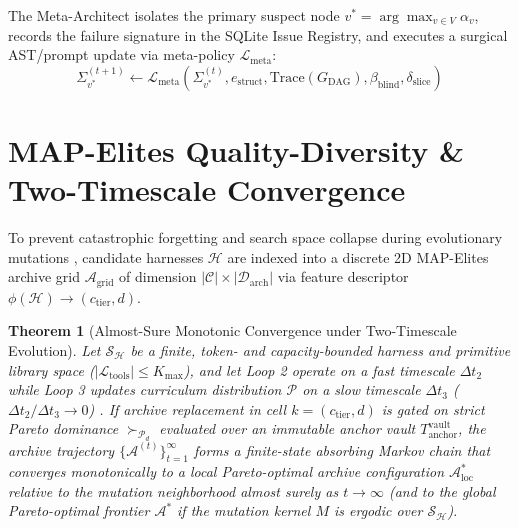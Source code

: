 \documentclass[10pt,twocolumn,letterpaper]{article}
\newtheorem{theorem}{Theorem}
\begin{document}
The Meta-Architect isolates the primary suspect node $v^{*}=\arg\max_{v\in V}\alpha_{v}$, records the failure signature in the SQLite Issue Registry, and executes a surgical AST/prompt update via meta-policy $\mathcal{L}_{\text{meta}}$:
\begin{equation}
\Sigma_{v^{*}}^{(t+1)} \leftarrow \mathcal{L}_{\text{meta}}\!\left(\Sigma_{v^{*}}^{(t)}, e_{\text{struct}}, \text{Trace}(G_{\text{DAG}}), \beta_{\text{blind}}, \delta_{\text{slice}}\right)
\end{equation}

\section{MAP-Elites Quality-Diversity \& Two-Timescale Convergence}
To prevent catastrophic forgetting and search space collapse during evolutionary mutations \cite{mouret2015}, candidate harnesses $\mathcal{H}$ are indexed into a discrete 2D MAP-Elites archive grid $\mathcal{A}_{\text{grid}}$ of dimension $|\mathcal{C}|\times|\mathcal{D}_{\text{arch}}|$ via feature descriptor $\phi(\mathcal{H})\to(c_{\text{tier}},d)$.

\begin{theorem}[Almost-Sure Monotonic Convergence under Two-Timescale Evolution]
Let $\mathcal{S}_{\mathcal{H}}$ be a finite, token- and capacity-bounded harness and primitive library space ($|\mathcal{L}_{\text{tools}}|\le K_{\max}$), and let Loop 2 operate on a fast timescale $\Delta t_{2}$ while Loop 3 updates curriculum distribution $\mathcal{P}$ on a slow timescale $\Delta t_{3}$ ($\Delta t_{2}/\Delta t_{3}\to 0$) \cite{borkar1997}. If archive replacement in cell $k=(c_{\text{tier}},d)$ is gated on strict Pareto dominance $\succ_{\mathcal{P}_{d}}$ evaluated over an immutable anchor vault $T_{\text{anchor}}^{\text{vault}}$, the archive trajectory $\{\mathcal{A}^{(t)}\}_{t=1}^{\infty}$ forms a finite-state absorbing Markov chain that converges monotonically to a local Pareto-optimal archive configuration $\mathcal{A}_{\text{loc}}^{*}$ relative to the mutation neighborhood almost surely as $t\to\infty$ (and to the global Pareto-optimal frontier $\mathcal{A}^{*}$ if the mutation kernel $M$ is ergodic over $\mathcal{S}_{\mathcal{H}}$).
\end{theorem}
\end{document}
